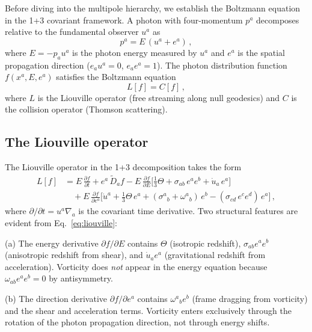 Before diving into the multipole hierarchy, we establish the
Boltzmann equation in the 1+3 covariant framework.  A photon
with four-momentum $p^a$ decomposes relative to the fundamental
observer $u^a$ as
\begin{equation}\label{eq:photon-decomp}
p^a = E\,(u^a + e^a)\,,
\end{equation}
where $E = -p_a u^a$ is the photon energy measured by $u^a$ and
$e^a$ is the spatial propagation direction ($e_a u^a = 0$,
$e_a e^a = 1$).  The photon distribution function
$f(x^a, E, e^a)$ satisfies the Boltzmann equation
\begin{equation}\label{eq:boltzmann}
L[f] = C[f]\,,
\end{equation}
where $L$ is the Liouville operator (free streaming along null
geodesics) and $C$ is the collision operator (Thomson
scattering).


\subsection{The Liouville operator}\label{sec:liouville}

The Liouville operator in the 1+3 decomposition takes the
form~\cite{EllisVanElst1999,MaartensGE1999}
\begin{equation}\label{eq:liouville}
\begin{split}
L[f] &= E\,\frac{\partial f}{\partial t}
  + e^a\,\tilde{D}_a f
  - E\,\frac{\partial f}{\partial E}\bigl[
    \tfrac{1}{3}\Theta + \sigma_{ab}\,e^a e^b
    + \dot{u}_a\,e^a
  \bigr] \\
  &\quad + E\,\frac{\partial f}{\partial e^a}\bigl[
    \dot{u}^a + \tfrac{1}{3}\Theta\,e^a
    + (\sigma^a{}_b + \omega^a{}_b)\,e^b
    - (\sigma_{cd}\,e^c e^d)\,e^a
  \bigr]\,,
\end{split}
\end{equation}
where $\partial/\partial t = u^a \nabla_a$ is the covariant
time derivative.  Two structural features are evident from
Eq.~\eqref{eq:liouville}:

(a) The energy derivative $\partial f/\partial E$ contains
$\Theta$ (isotropic redshift), $\sigma_{ab}e^a e^b$ (anisotropic
redshift from shear), and $\dot{u}_a e^a$ (gravitational
redshift from acceleration).  Vorticity does \emph{not} appear
in the energy equation because $\omega_{ab}e^a e^b = 0$ by
antisymmetry.

(b) The direction derivative $\partial f/\partial e^a$ contains
$\omega^a{}_b e^b$ (frame dragging from vorticity) and the shear
and acceleration terms.  Vorticity enters exclusively through
the rotation of the photon propagation direction, not through
energy shifts.


